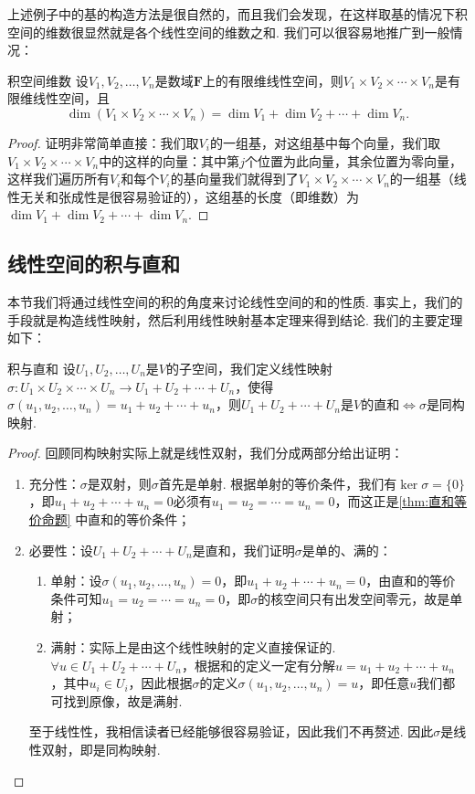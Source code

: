 上述例子中的基的构造方法是很自然的，而且我们会发现，在这样取基的情况下积空间的维数很显然就是各个线性空间的维数之和. 我们可以很容易地推广到一般情况：
\begin{theorem}{}{积空间维数}
    设$V_1,V_2,\ldots,V_n$是数域$\mathbf{F}$上的有限维线性空间，则$V_1 \times V_2 \times \cdots \times V_n$是有限维线性空间，且
    \[\dim(V_1 \times V_2 \times \cdots \times V_n)=\dim V_1+\dim V_2+\cdots+\dim V_n.\]
\end{theorem}

\begin{proof}
    证明非常简单直接：我们取$V_i$的一组基，对这组基中每个向量，我们取$V_1 \times V_2 \times \cdots \times V_n$中的这样的向量：其中第$j$个位置为此向量，其余位置为零向量，这样我们遍历所有$V_i$和每个$V_i$的基向量我们就得到了$V_1 \times V_2 \times \cdots \times V_n$的一组基（线性无关和张成性是很容易验证的），这组基的长度（即维数）为$\dim V_1+\dim V_2+\cdots+\dim V_n$.
\end{proof}

\subsection{线性空间的积与直和}

本节我们将通过线性空间的积的角度来讨论线性空间的和的性质. 事实上，我们的手段就是构造线性映射，然后利用线性映射基本定理来得到结论. 我们的主要定理如下：
\begin{theorem}{}{积与直和}
    设$U_1,U_2,\ldots,U_n$是$V$的子空间，我们定义线性映射$\sigma:U_1 \times U_2 \times \cdots \times U_n \to U_1+U_2+\cdots+U_n$，使得$\sigma(u_1,u_2,\ldots,u_n)=u_1+u_2+\cdots+u_n$，则$U_1+U_2+\cdots+U_n$是$V$的直和$\iff \sigma$是同构映射.
\end{theorem}

\begin{proof}
    回顾同构映射实际上就是线性双射，我们分成两部分给出证明：
    \begin{enumerate}
        \item 充分性：$\sigma$是双射，则$\sigma$首先是单射. 根据单射的等价条件，我们有$\ker \sigma=\{0\}$，即$u_1+u_2+\cdots+u_n=0$必须有$u_1=u_2=\cdots=u_n=0$，而这正是\autoref{thm:直和等价命题} 中直和的等价条件；

        \item 必要性：设$U_1+U_2+\cdots+U_n$是直和，我们证明$\sigma$是单的、满的：
              \begin{enumerate}
                  \item 单射：设$\sigma(u_1,u_2,\ldots,u_n)=0$，即$u_1+u_2+\cdots+u_n=0$，由直和的等价条件可知$u_1=u_2=\cdots=u_n=0$，即$\sigma$的核空间只有出发空间零元，故是单射；

                  \item 满射：实际上是由这个线性映射的定义直接保证的. $\forall u \in U_1+U_2+\cdots+U_n$，根据和的定义一定有分解$u=u_1+u_2+\cdots+u_n$，其中$u_i \in U_i$，因此根据$\sigma$的定义$\sigma(u_1,u_2,\ldots,u_n)=u$，即任意$u$我们都可找到原像，故是满射.
              \end{enumerate}
              至于线性性，我相信读者已经能够很容易验证，因此我们不再赘述. 因此$\sigma$是线性双射，即是同构映射.
    \end{enumerate}
\end{proof}

